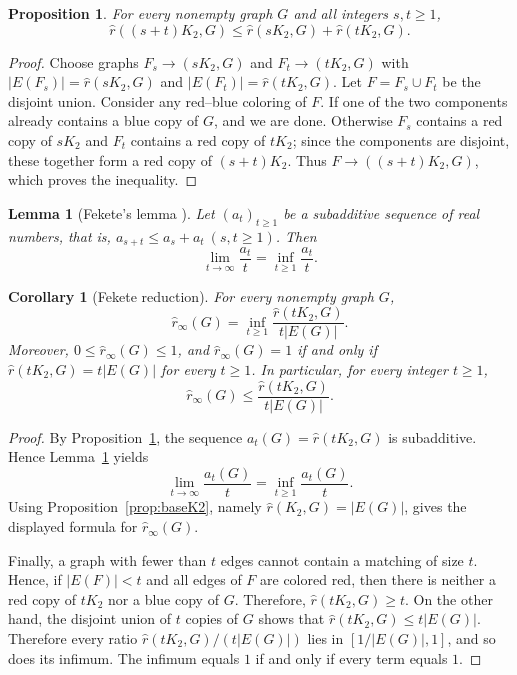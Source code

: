 \documentclass[11pt]{article}
\newcommand{\sr}{\hat r}
\newcommand{\sri}{\hat r_{\infty}}
\newtheorem{proposition}[theorem]{Proposition}
\newtheorem{lemma}[theorem]{Lemma}
\newtheorem{corollary}[theorem]{Corollary}
\theoremstyle{definition}
\theoremstyle{remark}
\begin{document}
\begin{proposition}\label{prop:subadd}
For every nonempty graph $G$ and all integers $s,t\ge 1$,
\[
\sr((s+t)K_2,G)\le \sr(sK_2,G)+\sr(tK_2,G).
\]
\end{proposition}

\begin{proof}
Choose graphs $F_s\to(sK_2,G)$ and $F_t\to(tK_2,G)$ with
$|E(F_s)|=\sr(sK_2,G)$ and $|E(F_t)|=\sr(tK_2,G)$. Let
$F=F_s\cup F_t$
be the disjoint union. Consider any red--blue coloring of $F$. If one of the two components
already contains a blue copy of $G$, and we are done. Otherwise $F_s$ contains a red copy
of $sK_2$ and $F_t$ contains a red copy of $tK_2$; since the components are disjoint, these
together form a red copy of $(s+t)K_2$. Thus $F\to((s+t)K_2,G)$, which proves the inequality.
\end{proof}

\begin{lemma}[Fekete's lemma \cite{Fekete23}]\label{lem:fekete}
Let $(a_t)_{t\ge 1}$ be a subadditive sequence of real numbers, that is,
$a_{s+t}\le a_s+a_t
~(s,t\ge 1)$.
Then
\[
\lim_{t\to\infty}\frac{a_t}{t}
=
\inf_{t\ge 1}\frac{a_t}{t}.
\]
\end{lemma}

\begin{corollary}[Fekete reduction]\label{cor:fekete-reduction}
For every nonempty graph $G$,
\[
\sri(G)=\inf_{t\ge 1}\frac{\sr(tK_2,G)}{t|E(G)|}.
\]
Moreover,
$0 \le \sri(G)\le 1$,
and
$\sri(G)=1$
if and only if 
$\sr(tK_2,G)=t|E(G)|$
for every $t\ge 1$.
In particular, for every integer $t\ge 1$,
\[
\sri(G)\le \frac{\sr(tK_2,G)}{t|E(G)|}.
\]
\end{corollary}

\begin{proof}
By Proposition~\ref{prop:subadd}, the sequence $a_t(G)=\sr(tK_2,G)$ is subadditive.
Hence Lemma~\ref{lem:fekete} yields
\[
\lim_{t\to\infty}\frac{a_t(G)}{t}=
\inf_{t\ge 1}\frac{a_t(G)}{t}.
\]
Using Proposition~\ref{prop:baseK2}, namely $\sr(K_2,G)=|E(G)|$, gives the displayed
formula for $\sri(G)$.

Finally, a graph with fewer than $t$ edges cannot contain a matching of size $t$.
Hence, if $|E(F)|<t$ and all edges of $F$ are colored red, then there is neither a red copy
of $tK_2$ nor a blue copy of $G$. Therefore, 
$\sr(tK_2,G)\ge t$.
On the other hand, the disjoint union of $t$ copies of $G$ shows that
$\sr(tK_2,G)\le t|E(G)|$.
Therefore every ratio $\sr(tK_2,G)/(t|E(G)|)$ lies in $[1/|E(G)|,1]$, and so does its
infimum. The infimum equals $1$ if and only if every term equals $1$.
\end{proof}
\end{document}
